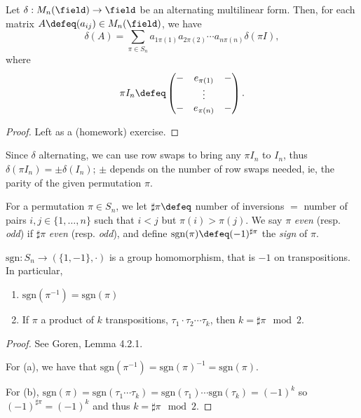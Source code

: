 \begin{proposition}\label{prop:alternatingmultilinearpermutations}
    Let $\delta : M_n{(\field)} \to \field$ be an alternating multilinear form. Then, for each matrix $A \defeq (a_{ij}) \in M_n(\field)$, we have \[
    \delta(A)     = \sum_{ \pi \in S_n}a_{1 \pi(1)}a_{2 \pi(2)}\cdots a_{n\pi(n)} \delta(\pi I),
    \]
    where \[
    \pi I_n \defeq \begin{pmatrix}
        - & e_{\pi(1)} & -\\
        & \vdots & \\
        - & e_{\pi(n)} & -
    \end{pmatrix}.
    \]
\end{proposition}
\begin{proof}
    Left as a (homework) exercise.
\end{proof}
\begin{remark}
    Since $\delta$ alternating, we can use row swaps to bring any $\pi I_n$ to $I_n$, thus $\delta(\pi I_n) = \pm \delta(I_n)$; $\pm$ depends on the number of row swaps needed, ie, the parity of the given permutation $\pi$.
\end{remark}

\begin{definition}[Parity]
    For a permutation $\pi \in S_n$, we let $\sharp \pi \defeq $ number of inversions $ = $ number of pairs $i, j\in \{1, \dots, n\}$ such that $i < j$ but $\pi(i) > \pi(j)$. We say $\pi$ \emph{even} (resp. \emph{odd}) if $\sharp\pi$ \emph{even} (resp. \emph{odd}), and define $\text{sgn}(\pi) \defeq (-1)^{\sharp \pi}$ the \emph{sign} of $\pi$.
\end{definition}

\begin{proposition}
    $\text{sgn} : S_n \to (\{1, -1\}, \cdot)$ is a group homomorphism, that is $-1$ on transpositions. In particular, \begin{enumerate}
        \item $\text{sgn}(\pi^{-1}) = \text{sgn}(\pi)$
        \item If $\pi$ a product of $k$ transpositions, $\tau_1 \cdot \tau_2 \cdots \tau_k$, then $k = \sharp \pi \mod 2$.
    \end{enumerate}
\end{proposition}

\begin{proof}
    See Goren, Lemma 4.2.1. 
    
    For (a), we have that $\text{sgn}(\pi^{-1}) = \text{sgn}(\pi)^{-1} = \text{sgn}(\pi)$.

    For (b), $\text{sgn}(\pi) = \text{sgn}(\tau_1 \cdots \tau_k) = \text{sgn}(\tau_1) \cdots \text{sgn}(\tau_k) = (-1)^k$ so $(-1)^{\sharp \pi} = (-1)^k$ and thus $k = \sharp \pi \mod 2$.
\end{proof}

